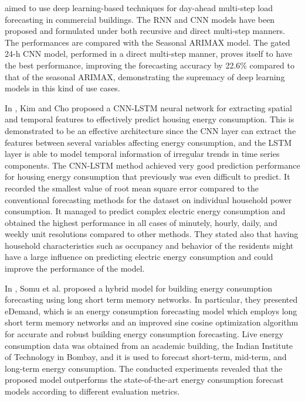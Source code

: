 \cite{CAI20191078} aimed to use deep learning-based techniques for day-ahead multi-step load forecasting in commercial buildings.
The RNN and CNN models have been proposed and formulated under both recursive and direct multi-step manners.
The performances are compared with the Seasonal ARIMAX model.
The gated 24-h CNN model, performed in a direct multi-step manner, proves itself to have the best performance, improving the forecasting accuracy by 22.6\% compared to that of the seasonal ARIMAX, demonstrating the supremacy of deep learning models in this kind of use cases.

In \cite{KIM201972}, Kim and Cho proposed a CNN-LSTM neural network for extracting spatial and temporal features to effectively predict housing energy consumption.
This is demonstrated to be an effective architecture since the CNN layer can extract the features between several variables affecting energy consumption, and the LSTM layer is able to model temporal information of irregular trends in time series components.
The CNN-LSTM method achieved very good prediction performance for housing energy consumption that previously was even difficult to predict.
It recorded the smallest value of root mean square error compared to the conventional forecasting methods for the dataset on individual household power consumption.
It managed to predict complex electric energy consumption and obtained the highest performance in all cases of minutely, hourly, daily, and weekly unit resolutions compared to other methods.
They stated also that having household characteristics such as occupancy and behavior of the residents might have a large influence on predicting electric energy consumption and could improve the performance of the model.

In \cite{SOMU2020114131}, Somu et al. proposed a hybrid model for building energy consumption forecasting using long short term memory networks.
In particular, they presented eDemand, which is an energy consumption forecasting model which employs long short term memory networks and an improved sine cosine optimization algorithm for accurate and robust building energy consumption forecasting.
Live energy consumption data was obtained from an academic building, the Indian Institute of Technology in Bombay, and it is used to forecast short-term, mid-term, and long-term energy consumption.
The conducted experiments revealed that the proposed model outperforms the state-of-the-art energy consumption forecast models according to different evaluation metrics.

